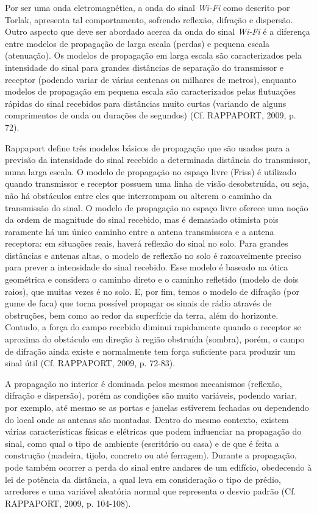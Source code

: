 \documentclass[
	12pt,				%
	openright,			%
	twoside,			%
	a4paper,			%
	english,			%
	french,				%
	spanish,			%
	brazil				%
	]{abntex2}
\begin{document}
Por ser uma onda eletromagnética, a onda do sinal \textit{Wi-Fi} como descrito por Torlak, apresenta tal comportamento, sofrendo reflexão, difração e dispersão. Outro aspecto que deve ser abordado acerca da onda do sinal \textit{Wi-Fi} é a diferença entre modelos de propagação de larga escala (perdas) e pequena escala (atenuação). Os modelos de propagação em larga escala são caracterizados pela intensidade do sinal para grandes distâncias de separação do transmissor e receptor (podendo variar de várias centenas ou milhares de metros), enquanto modelos de propagação em pequena escala são caracterizados pelas flutuações rápidas do sinal recebidos para distâncias muito curtas (variando de alguns comprimentos de onda ou durações de segundos) (Cf. RAPPAPORT, 2009, p. 72).

Rappaport define três modelos básicos de propagação que são usados para a previsão da intensidade do sinal recebido a determinada distância do transmissor, numa larga escala. O modelo de propagação no espaço livre (Friss) é utilizado quando transmissor e receptor possuem uma linha de visão desobstruída, ou seja, não há obstáculos entre eles que interrompam ou alterem o caminho da transmissão do sinal. O modelo de propagação no espaço livre oferece uma noção da ordem de magnitude do sinal recebido, mas é demasiado otimista pois raramente há um único caminho entre a antena transmissora e a antena receptora: em situações reais, haverá reflexão do sinal no solo. Para grandes distâncias e antenas altas, o modelo de reflexão no solo é razoavelmente preciso para prever a intensidade do sinal recebido. Esse modelo é baseado na ótica geométrica e considera o caminho direto e o caminho refletido (modelo de dois raios), que muitas vezes é no solo. E, por fim, temos o modelo de difração (por gume de faca) que torna possível propagar os sinais de rádio através de obstruções, bem como ao redor da superfície da terra, além do horizonte. Contudo, a força do campo recebido diminui rapidamente quando o receptor se aproxima do obstáculo em direção à região obstruída (sombra), porém, o campo de difração ainda existe e normalmente tem força suficiente para produzir um sinal útil (Cf. RAPPAPORT, 2009, p. 72-83).

A propagação no interior é dominada pelos mesmos mecanismos (reflexão, difração e dispersão), porém as condições são muito variáveis, podendo variar, por exemplo, até mesmo se as portas e janelas estiverem fechadas ou dependendo do local onde as antenas são montadas. Dentro do mesmo contexto, existem várias características físicas e elétricas que podem influenciar na propagação do sinal, como qual o tipo de ambiente (escritório ou casa) e de que é feita a construção (madeira, tijolo, concreto ou até ferragem). Durante a propagação, pode também ocorrer a perda do sinal entre andares de um edifício, obedecendo à lei de potência da distância, a qual leva em consideração o tipo de prédio, arredores e uma variável aleatória normal que representa o desvio padrão (Cf. RAPPAPORT, 2009, p. 104-108). 
\end{document}
